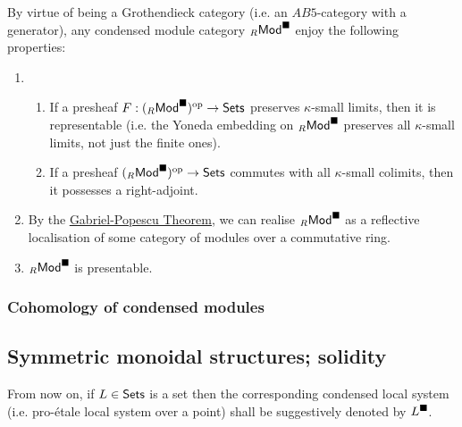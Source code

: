                 \begin{corollary} \label{coro: condensed_modules_properties}
                    By virtue of being a Grothendieck category (i.e. an $AB5$-category with a generator), any condensed module category ${}_R\mathsf{Mod}^{\blacksquare}$ enjoy the following properties:
                        \begin{enumerate}
                            \item 
                                \begin{enumerate}
                                    \item If a presheaf $F: ({}_R\mathsf{Mod}^{\blacksquare})^{\mathrm{op}} \to \mathsf{Sets}$ preserves $\kappa$-small limits, then it is representable (i.e. the Yoneda embedding on ${}_R\mathsf{Mod}^{\blacksquare}$ preserves all $\kappa$-small limits, not just the finite ones).
                                    \item If a presheaf $({}_R\mathsf{Mod}^{\blacksquare})^{\mathrm{op}} \to \mathsf{Sets}$ commutes with all $\kappa$-small colimits, then it possesses a right-adjoint. 
                                \end{enumerate}
                            \item By the \href{https://ncatlab.org/nlab/show/Gabriel-Popescu+theorem}{\underline{Gabriel-Popescu Theorem}}, we can realise ${}_R\mathsf{Mod}^{\blacksquare}$ as a reflective localisation of some category of modules over a commutative ring. 
                            \item ${}_R\mathsf{Mod}^{\blacksquare}$ is presentable. 
                        \end{enumerate}
                \end{corollary}
                
            \subsubsection{Cohomology of condensed modules}
            
        \subsection{Symmetric monoidal structures; solidity}
            \begin{convention}
                From now on, if $L \in \mathsf{Sets}$ is a set then the corresponding condensed local system (i.e. pro-\'etale local system over a point) shall be suggestively denoted by $L^{\blacksquare}$.
            \end{convention}
        
